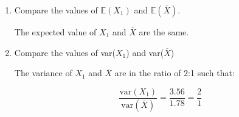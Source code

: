\begin{enumerate}[label=(\alph*)]
        \item Compare the values of $\mathbb{E}(X_{1})$ and $\mathbb{E}(\overline{X})$.
        \\
        \begin{mdframed}
            The expected value of $X_{1}$ and $\overline{X}$ are the same.
        \end{mdframed}

        \item Compare the values of var($X_{1}$) and var($\overline{X}$)
        \\
        \begin{mdframed}
            The variance of $X_{1}$ and $\overline{X}$ are in the ratio of 2:1 such that:

            \begin{equation*}
                \frac{\text{var}(X_{1})}{\text{var}(\overline{X})} = \frac{3.56}{1.78} = \frac{2}{1}
            \end{equation*}
        \end{mdframed}
    \end{enumerate}

